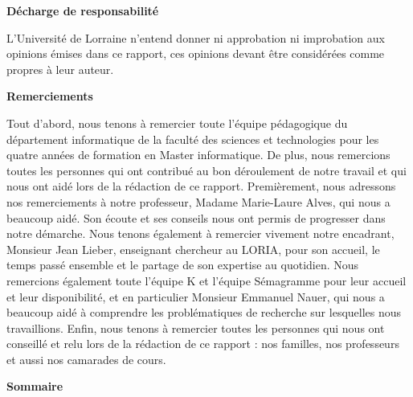 \documentclass{article}
\begin{document}
\thispagestyle{empty}
\begin{center}
{\bfseries \huge D\'echarge de responsabilit\'e}
\end{center}
\vspace*{10mm}

L'Universit\'{e} de Lorraine n'entend donner ni approbation ni improbation aux opinions \'{e}mises dans ce rapport, ces opinions devant \^{e}tre consid\'{e}r\'{e}es comme propres \`{a} leur auteur.
\cleardoublepage


\thispagestyle{empty}
\begin{center}
{\bfseries \huge Remerciements}
\end{center}
\vspace*{10mm}

Tout d'abord, nous tenons \`{a} remercier toute l'\'{e}quipe p\'{e}dagogique du d\'{e}partement informatique de la facult\'{e} des sciences et technologies pour les quatre ann\'{e}es de formation en Master informatique.
\newline
De plus, nous remercions toutes les personnes qui ont contribu\'{e} au bon d\'{e}roulement de notre travail et qui nous ont aid\'{e} lors de la r\'{e}daction de ce rapport. Premi\`{e}rement, nous adressons nos remerciements \`{a} notre professeur, Madame Marie-Laure Alves, qui nous a beaucoup aid\'{e}. Son \'{e}coute et ses conseils nous ont permis de progresser dans notre d\'{e}marche.
\newline
Nous tenons \'{e}galement \`{a} remercier vivement notre encadrant, Monsieur Jean Lieber, enseignant chercheur au LORIA, pour son accueil, le temps pass\'{e} ensemble et le partage de son expertise au quotidien. Nous remercions \'{e}galement toute l'\'{e}quipe K et l'\'{e}quipe S\'{e}magramme pour leur accueil et leur disponibilit\'{e}, et en particulier Monsieur Emmanuel Nauer, qui nous a beaucoup aid\'{e} \`{a} comprendre les probl\'{e}matiques de recherche sur lesquelles nous travaillions. Enfin, nous tenons \`{a} remercier toutes les personnes qui nous ont conseill\'{e} et relu lors de la r\'{e}daction de ce rapport : nos familles, nos professeurs et aussi nos camarades de cours.

\cleardoublepage


\begin{center}
{\bfseries \huge Sommaire}
\end{center}
\tableofcontents


\setcounter{page}{3}
\end{document}
